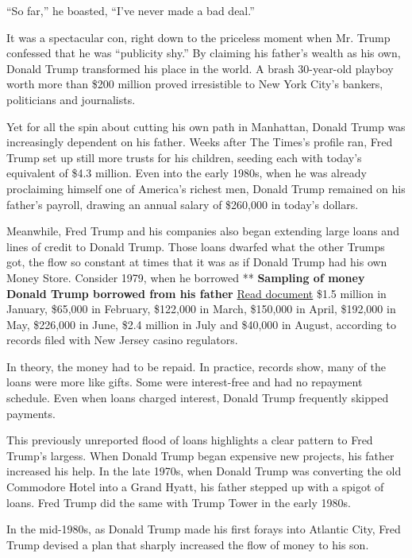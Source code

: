 ``So far,'' he boasted, ``I've never made a bad deal.''

It was a spectacular con, right down to the priceless moment when Mr.
Trump confessed that he was ``publicity shy.'' By claiming his father's
wealth as his own, Donald Trump transformed his place in the world. A
brash 30-year-old playboy worth more than \$200 million proved
irresistible to New York City's bankers, politicians and journalists.

Yet for all the spin about cutting his own path in Manhattan, Donald
Trump was increasingly dependent on his father. Weeks after The Times's
profile ran, Fred Trump set up still more trusts for his children,
seeding each with today's equivalent of \$4.3 million. Even into the
early 1980s, when he was already proclaiming himself one of America's
richest men, Donald Trump remained on his father's payroll, drawing an
annual salary of \$260,000 in today's dollars.

Meanwhile, Fred Trump and his companies also began extending large loans
and lines of credit to Donald Trump. Those loans dwarfed what the other
Trumps got, the flow so constant at times that it was as if Donald Trump
had his own Money Store. Consider 1979, when he borrowed **
\textbf{Sampling of money Donald Trump borrowed from his father}
\href{https://int.nyt.com/data/documenthelper/188-djt-borrowings-1979/0e4bc1daf254d4c19ed5/optimized/full.pdf\#page=1}{Read
document} \$1.5 million in January, \$65,000 in February, \$122,000 in
March, \$150,000 in April, \$192,000 in May, \$226,000 in June, \$2.4
million in July and \$40,000 in August, according to records filed with
New Jersey casino regulators.

In theory, the money had to be repaid. In practice, records show, many
of the loans were more like gifts. Some were interest-free and had no
repayment schedule. Even when loans charged interest, Donald Trump
frequently skipped payments.

This previously unreported flood of loans highlights a clear pattern to
Fred Trump's largess. When Donald Trump began expensive new projects,
his father increased his help. In the late 1970s, when Donald Trump was
converting the old Commodore Hotel into a Grand Hyatt, his father
stepped up with a spigot of loans. Fred Trump did the same with Trump
Tower in the early 1980s.

In the mid-1980s, as Donald Trump made his first forays into Atlantic
City, Fred Trump devised a plan that sharply increased the flow of money
to his son.

